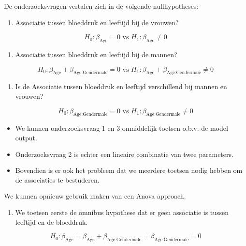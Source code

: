 \documentclass[
  12pt,dutch,coursenotes]{book}
\providecommand{\tightlist}{%
  \setlength{\itemsep}{0pt}\setlength{\parskip}{0pt}}
\begin{document}
De onderzoeksvragen vertalen zich in de volgende nullhypotheses:

\begin{enumerate}
\def\labelenumi{\arabic{enumi}.}
\tightlist
\item
  Associatie tussen bloeddruk en leeftijd bij de vrouwen?
\end{enumerate}

\[
H_0: \beta_\text{Age} = 0 \text{ vs } H_1: \beta_\text{Age} \neq 0
\]

\begin{enumerate}
\def\labelenumi{\arabic{enumi}.}
\setcounter{enumi}{1}
\tightlist
\item
  Associatie tussen bloeddruk en leeftijd bij de mannen?
\end{enumerate}

\[
H_0: \beta_\text{Age} + \beta_\text{Age:Gendermale} = 0 \text{ vs } H_1: \beta_\text{Age} + \beta_\text{Age:Gendermale} \neq 0
\]

\begin{enumerate}
\def\labelenumi{\arabic{enumi}.}
\setcounter{enumi}{2}
\tightlist
\item
  Is de Associatie tussen bloeddruk en leeftijd verschillend bij mannen en vrouwen?
\end{enumerate}

\[H_0: \beta_\text{Age:Gendermale} = 0 \text{ vs } H_1: \beta_\text{Age:Gendermale} \neq 0
\]

\begin{itemize}
\tightlist
\item
  We kunnen onderzoeksvraag 1 en 3 onmiddelijk toetsen o.b.v. de model output.
\item
  Onderzoeksvraag 2 is echter een lineaire combinatie van twee parameters.
\item
  Bovendien is er ook het probleem dat we meerdere toetsen nodig hebben om de associaties te bestuderen.
\end{itemize}

We kunnen opnieuw gebruik maken van een Anova approach.

\begin{enumerate}
\def\labelenumi{\arabic{enumi}.}
\tightlist
\item
  We toetsen eerste de omnibus hypothese dat er geen associatie is tussen leeftijd en de bloeddruk.
\end{enumerate}

\[
H_0: \beta_\text{Age} = \beta_\text{Age} + \beta_\text{Age:Gendermale} = \beta_\text{Age:Gendermale} = 0
\]
\end{document}
